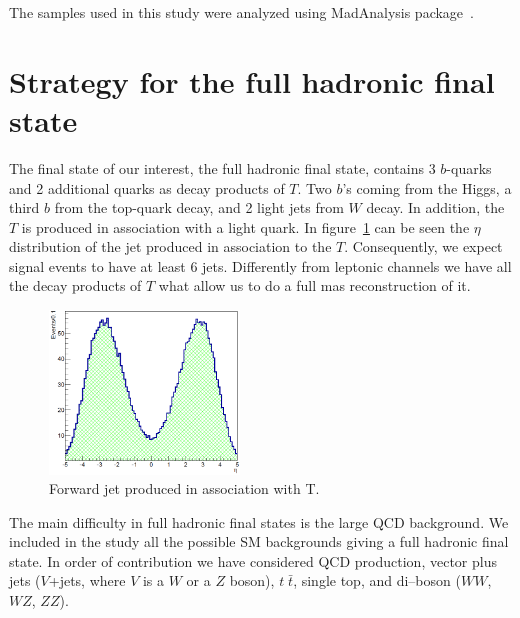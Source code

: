 The samples used in this study were analyzed using MadAnalysis package~\cite{Conte:2012fm, Conte:2014zja}.

\section{Strategy for the full hadronic final state}
\label{sec:Pstra}

The final state of our interest, the full hadronic final state, contains 3 $b$-quarks and 2 additional quarks as decay products of $T$. Two $b$'s coming from the Higgs, a third $b$ from the top-quark decay, and 2 light jets from $W$ decay. In addition, the $T$ is produced in association with a light quark. In figure~\ref{fig:ForwJ} can be seen the $\eta$ distribution of the jet produced in association to the $T$. Consequently, we expect signal events to have at least 6 jets. Differently from leptonic channels we have all the decay products of $T$ what allow us to do a full mas reconstruction of it.

\begin{figure}[!Hhtbp]
  \begin{center}
    \includegraphics[width=0.45\textwidth]{figs/Pheno/SixthJet.png}
    \caption{Forward jet produced in association with T.}
    \label{fig:ForwJ}
  \end{center}
\end{figure}

The main difficulty in full hadronic final states is the large QCD background. We included in the study all the possible SM backgrounds giving a full hadronic final state. In order of contribution we have considered QCD production, vector plus jets ($V$+jets, where $V$ is a $W$ or a $Z$ boson), $t\; \bar{t}$, single top, and di--boson ($WW$, $WZ$, $ZZ$). 

